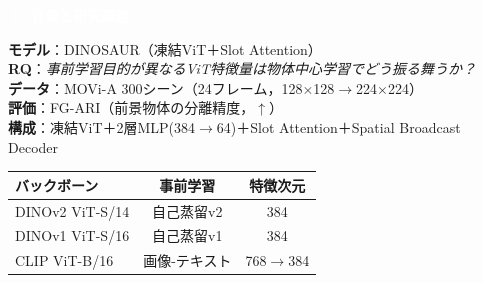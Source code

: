 \documentclass[dvipdfmx,a4paper,landscape]{jarticle}
\newcommand{\sechead}[1]{%
  \colorbox{secblue}{\textcolor{white}{\scriptsize\textbf{\,#1\,}}}%
}
\begin{document}
\noindent
\begin{minipage}[t]{0.32\linewidth}
\sechead{1.\ 背景と研究課題}
\vspace{1mm}

\scriptsize
\textbf{モデル}：DINOSAUR（凍結ViT＋Slot Attention）\\
\textbf{RQ}：\textit{事前学習目的が異なるViT特徴量は物体中心学習でどう振る舞うか？}\\[1mm]
\textbf{データ}：MOVi-A 300シーン（24フレーム，128$\times$128$\to$224$\times$224）\\
\textbf{評価}：FG-ARI（前景物体の分離精度，$\uparrow$）\\
\textbf{構成}：凍結ViT＋2層MLP(384$\to$64)＋Slot Attention＋Spatial Broadcast Decoder

\vspace{1mm}
\begin{tabular}{lcc}
\toprule
{\scriptsize バックボーン} & {\scriptsize 事前学習} & {\scriptsize 特徴次元} \\
\midrule
{\scriptsize DINOv2 ViT-S/14} & {\scriptsize 自己蒸留v2} & {\scriptsize 384} \\
{\scriptsize DINOv1 ViT-S/16} & {\scriptsize 自己蒸留v1} & {\scriptsize 384} \\
{\scriptsize CLIP ViT-B/16} & {\scriptsize 画像-テキスト} & {\scriptsize 768$\to$384} \\
\bottomrule
\end{tabular}
\end{minipage}
\hfill
\end{document}
